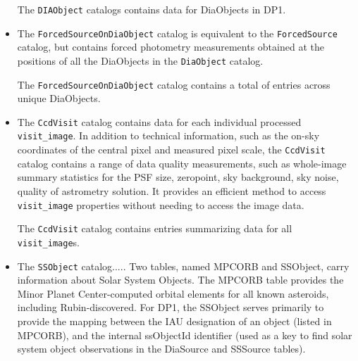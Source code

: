 \begin{itemize}
The \texttt{DIAObject} catalogs contains data for \ndiaobjects DiaObjects in \gls{DP1}.


\item The \texttt{ForcedSourceOnDiaObject} catalog is equivalent to the \texttt{ForcedSource} catalog, but contains \gls{forced photometry} measurements obtained at the positions of all the DiaObjects in the \texttt{DiaObject} catalog.

The \texttt{ForcedSourceOnDiaObject} catalog  contains a total of \ndiaforcedsources entries across \ndiaforcedobjects unique DiaObjects.


\item The \texttt{CcdVisit} catalog contains data for each individual processed \texttt{visit\_image}.
In addition to technical information, such as the on-sky coordinates of the central pixel and measured pixel scale, the \texttt{CcdVisit} catalog contains a range of data quality measurements, such as whole-image summary statistics for the PSF size, zeropoint, sky \gls{background}, sky noise, quality of astrometry solution.
It provides an efficient method to access  \texttt{visit\_image} properties without needing to access the image data.

The \texttt{CcdVisit} catalog contains entries summarizing data for all \nvisitdetectorsummaries \texttt{visit\_image}s.

\item The \texttt{SSObject} catalog..... Two tables, named MPCORB and SSObject, carry information about Solar System Objects. The MPCORB table provides the Minor Planet \gls{Center}-computed orbital elements for all known asteroids, including Rubin-discovered. For DP1, the SSObject serves primarily to provide the mapping between the IAU designation of an object (listed in MPCORB), and the internal ssObjectId identifier (used as a key to find solar system object observations in the DiaSource and SSSource tables).


\end{itemize}

